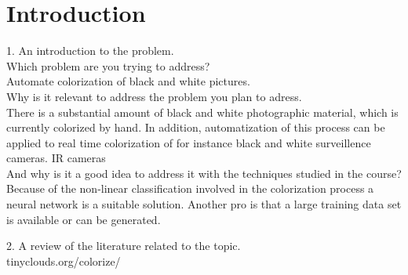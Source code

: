 \section{Introduction}
1. An introduction to the problem.\\
Which problem are you trying to address?\\
Automate colorization of black and white pictures. \\

Why is it relevant to address the problem you plan to adress.\\
There is a substantial amount of black and white photographic material, which is currently colorized by hand. In addition, automatization of this process can be applied to real time colorization of for instance black and white surveillence cameras. IR cameras\\

And why is it a good idea to address it with the techniques studied in the course?\\
Because of the non-linear classification involved in the colorization process  a neural network is a suitable solution. Another pro is that a large training data set is available or can be generated. 

2. A review of the literature related to the topic.\\
tinyclouds.org/colorize/\\



